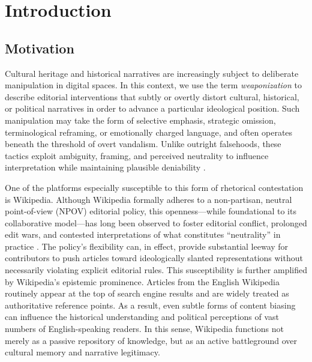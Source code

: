 \documentclass[11pt, a4paper, twoside, openright]{article} %
\begin{document}


\tableofcontents
\clearpage

\section{Introduction}

\subsection{Motivation}

Cultural heritage and historical narratives are increasingly subject to deliberate manipulation in digital spaces. In this context, we use the term \textit{weaponization} to describe editorial interventions that subtly or overtly distort cultural, historical, or political narratives in order to advance a particular ideological position. Such manipulation may take the form of selective emphasis, strategic omission, terminological reframing, or emotionally charged language, and often operates beneath the threshold of overt vandalism. Unlike outright falsehoods, these tactics exploit ambiguity, framing, and perceived neutrality to influence interpretation while maintaining plausible deniability \cite{MORRISOCONNOR2022784}.

One of the platforms especially susceptible to this form of rhetorical contestation is Wikipedia. Although Wikipedia formally adheres to a non-partisan, neutral point-of-view (NPOV) editorial policy, this openness—while foundational to its collaborative model—has long been observed to foster editorial conflict, prolonged edit wars, and contested interpretations of what constitutes ``neutrality'' in practice \cite{MORRISOCONNOR2022784}. The policy’s flexibility can, in effect, provide substantial leeway for contributors to push articles toward ideologically slanted representations without necessarily violating explicit editorial rules. This susceptibility is further amplified by Wikipedia’s epistemic prominence. Articles from the English Wikipedia routinely appear at the top of search engine results and are widely treated as authoritative reference points. As a result, even subtle forms of content biasing can influence the historical understanding and political perceptions of vast numbers of English-speaking readers. In this sense, Wikipedia functions not merely as a passive repository of knowledge, but as an active battleground over cultural memory and narrative legitimacy.
\end{document}
